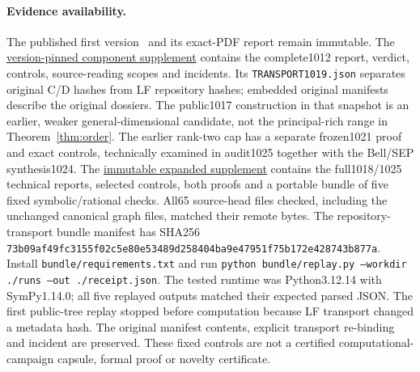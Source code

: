 \paragraph{Evidence availability.}
The published first version~\cite{VersionOne} and its exact-PDF report remain immutable. The
\href{https://github.com/lluiseriksson/physmath-knowledge-tree/tree/f4c3e3f66afcac612ee33ee650857584e046a213/integrations/research-radar/evidence/2026-10-27-pauli-components}{version-pinned component supplement}
contains the complete1012 report, verdict, controls, source-reading scopes and incidents. Its \texttt{TRANSPORT1019.json} separates original C/D hashes from LF repository hashes; embedded original manifests describe the original dossiers. The public1017 construction in that snapshot is an earlier, weaker general-dimensional candidate, not the principal-rich range in Theorem~\ref{thm:order}. The earlier rank-two cap has a separate frozen1021 proof and exact controls, technically examined in audit1025 together with the Bell/SEP synthesis1024. The
\href{https://github.com/lluiseriksson/physmath-knowledge-tree/tree/ce7f93cbdf6f28ea7342d7d63cb50c5755fe26fc/integrations/research-radar/evidence/2026-10-27-contraction-supplement}{immutable expanded supplement}
contains the full1018/1025 technical reports, selected controls, both proofs and a portable bundle of five fixed symbolic/rational checks. All65 source-head files checked, including the unchanged canonical graph files, matched their remote bytes. The repository-transport bundle manifest has SHA256
\texttt{73b09af49fc3155f02c5e80e53489d258404ba9e47951f75b172e428743b877a}.
Install \texttt{bundle/requirements.txt} and run \texttt{python bundle/replay.py --workdir ./runs --out ./receipt.json}. The tested runtime was Python3.12.14 with SymPy1.14.0; all five replayed outputs matched their expected parsed JSON. The first public-tree replay stopped before computation because LF transport changed a metadata hash. The original manifest contents, explicit transport re-binding and incident are preserved. These fixed controls are not a certified computational-campaign capsule, formal proof or novelty certificate.

